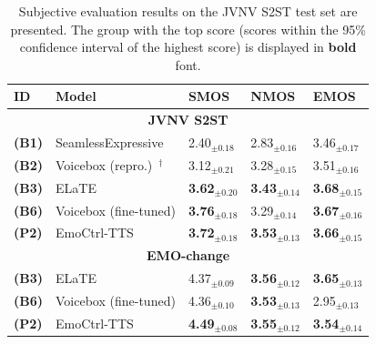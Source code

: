 \begin{table}[t]
        \caption{Subjective evaluation results on the JVNV S2ST test set are presented. The group with the top score (scores within the 95\% confidence interval of the highest score) is displayed in \textbf{bold} font.}
    \label{tab:subj_results_jvnv}
    {
    \footnotesize
        \begin{tabular}{@{}lllll@{}}
            \toprule
            \textbf{ID}    & \textbf{Model}  & \textbf{SMOS} & \textbf{NMOS} & \textbf{EMOS} \\ 
            \midrule 
            \multicolumn{5}{c}{\bf JVNV S2ST}\\
            \midrule
            \textbf{(B1)} & SeamlessExpressive~\cite{barrault2023seamless}         &  2.40$_{\pm 0.18}$  & 2.83$_{\pm 0.16}$  & 3.46$_{\pm 0.17}$    \\
            \textbf{(B2)} & Voicebox (repro.)~\cite{le2024voicebox}$^\dagger$  &  3.12$_{\pm 0.21}$  & 3.28$_{\pm 0.15}$  & 3.51$_{\pm 0.16}$    \\
            \textbf{(B3)} & ELaTE~\cite{kanda2024making}                       &  \bf{3.62}$_{\pm 0.20}$  & \textbf{3.43$_{\pm 0.14}$}  & \textbf{3.68$_{\pm 0.15}$}    \\
            \textbf{(B6)} & Voicebox (fine-tuned)                              &  \textbf{3.76$_{\pm 0.18}$}  & 3.29$_{\pm 0.14}$  & \textbf{3.67$_{\pm 0.16}$}    \\
            \textbf{(P2)} & EmoCtrl-TTS                                        &  \textbf{3.72$_{\pm 0.18}$}  & \textbf{3.53$_{\pm 0.13}$}  & \textbf{3.66$_{\pm 0.15}$}    \\ 
            \midrule
            \multicolumn{5}{c}{\bf EMO-change}\\
            \midrule
            \textbf{(B3)} & ELaTE~\cite{kanda2024making} &  4.37$_{\pm 0.09}$    &  \textbf{3.56}$_{\pm 0.12}$  &  \textbf{3.65}$_{\pm 0.13}$    \\
            \textbf{(B6)} & Voicebox (fine-tuned)            &  4.36$_{\pm 0.10}$    &  \textbf{3.53}$_{\pm 0.13}$    &  2.95$_{\pm 0.13}$    \\
            \textbf{(P2)} & EmoCtrl-TTS                   &  \textbf{4.49}$_{\pm 0.08}$    &  \textbf{3.55}$_{\pm 0.12}$  &  \textbf{3.54}$_{\pm 0.14}$    \\ 
            \bottomrule
        \end{tabular}
}
\vspace{-3mm}
\end{table}

